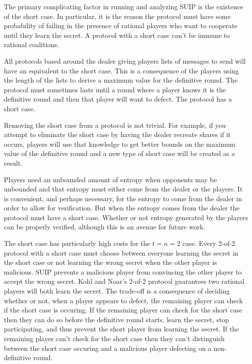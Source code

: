 \documentclass{dalcsthesis}
\begin{document}
The primary complicating factor in running and analyzing SUIP is the existence of the short case. In particular, it is the reason the protocol must have some probability of failing in the presence of rational players who want to cooperate until they learn the secret. A protocol with a short case can't be immune to rational coalitions.

All protocols based around the dealer giving players lists of messages to send will have an equivalent to the short case. This is a consequence of the players using the length of the lists to derive a maximum value for the definitive round. The protocol must sometimes lasts until a round where a player knows it is the definitive round and then that player will want to defect. The protocol has a short case.

Removing the short case from a protocol is not trivial. For example, if you attempt to eliminate the short case by having the dealer recreate shares if it occurs, players will use that knowledge to get better bounds on the maximum value of the definitive round and a new type of short case will be created as a result.

Players need an unbounded amount of entropy when opponents may be unbounded and that entropy must either come from the dealer or the players. It is convenient, and perhaps necessary, for the entropy to come from the dealer in order to allow for verification. But when the entropy comes from the dealer the protocol must have a short case. Whether or not entropy generated by the players can be properly verified, although this is an avenue for future work.

The short case has particularly high costs for the $t=n=2$ case. Every 2-of-2 protocol with a short case must choose between everyone learning the secret in the short case or not learning the wrong secret when the other player is malicious. SUIP prevents a malicious player from convincing the other player to accept the wrong secret. Kohl and Noar's 2-of-2 protocol \cite{kol08} guarantees two rational players will both learn the secret. The trade-off is a consequence of deciding whether or not, when a player appears to defect, the remaining player can check if the short case is occuring. If the remaining player can check for the short case then they can do so before the definitive round starts, learn the secret, stop participating, and thus prevent the short player from learning the secret. If the remaining player can't check for the short case then they can't distinguish between the short case occuring and a malicious player defecting on a non-definitive round.
\end{document}
